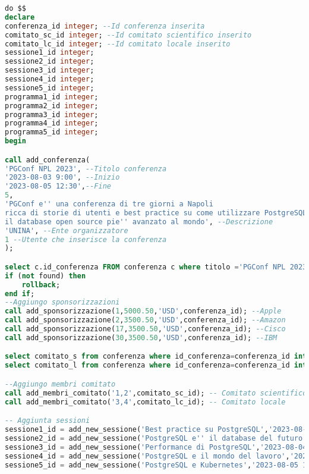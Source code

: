 \begin{lstlisting}[language=SQL, style=mystyle,caption={Conferenza PGConf NPL}]
do $$
declare
conferenza_id integer; --Id conferenza inserita
comitato_sc_id integer; --Id comitato scientifico inserito
comitato_lc_id integer; --Id comitato locale inserito
sessione1_id integer;
sessione2_id integer;
sessione3_id integer;
sessione4_id integer;
sessione5_id integer;
programma1_id integer;
programma2_id integer;
programma3_id integer;
programma4_id integer;
programma5_id integer;
begin

call add_conferenza(
'PGConf NPL 2023', --Titolo conferenza
'2023-08-03 9:00', --Inizio
'2023-08-05 12:30',--Fine
5,
'PGConf e'' una conferenza di tre giorni a Napoli 
ricca di storie di utenti e best practice su come utilizzare PostgreSQL, 
il database open source pie'' avanzato al mondo', --Descrizione
'UNINA', --Ente organizzatore
1 --Utente che inserisce la conferenza 
);

select c.id_conferenza FROM conferenza c where titolo ='PGConf NPL 2023' and inizio='2023-08-03 9:00' and fine='2023-08-05 12:30' and id_sede=5 into conferenza_id;
if (not found) then
    rollback;
end if;
--Aggiungo sponsorizzazioni
call add_sponsorizzazione(1,5000.50,'USD',conferenza_id); --Apple
call add_sponsorizzazione(2,3500.50,'USD',conferenza_id); --Amazon
call add_sponsorizzazione(17,3500.50,'USD',conferenza_id); --Cisco
call add_sponsorizzazione(30,3500.50,'USD',conferenza_id); --IBM

select comitato_s from conferenza where id_conferenza=conferenza_id into comitato_sc_id;
select comitato_l from conferenza where id_conferenza=conferenza_id into comitato_lc_id;

--Aggiungo membri comitato
call add_membri_comitato('1,2',comitato_sc_id); -- Comitato scientifico
call add_membri_comitato('3,4',comitato_lc_id); -- Comitato locale

-- Aggiunta sessioni
sessione1_id = add_new_sessione('Best practice su PostgreSQL','2023-08-03 10:30','2023-08-03 12:30',13,conferenza_id,1);
sessione2_id = add_new_sessione('PostgreSQL e'' il database del futuro','2023-08-03 14:30','2023-08-03 16:30',14,conferenza_id,2);
sessione3_id = add_new_sessione('Performance di PostgreSQL','2023-08-04 10:30','2023-08-04 12:30',15,conferenza_id,1);
sessione4_id = add_new_sessione('PostgreSQL e il mondo del lavoro','2023-08-04 14:30','2023-08-04 18:30',13,conferenza_id,2);
sessione5_id = add_new_sessione('PostgreSQL e Kubernetes','2023-08-05 10:30','2023-08-05 12:30',14,conferenza_id,1);


\end{lstlisting}
